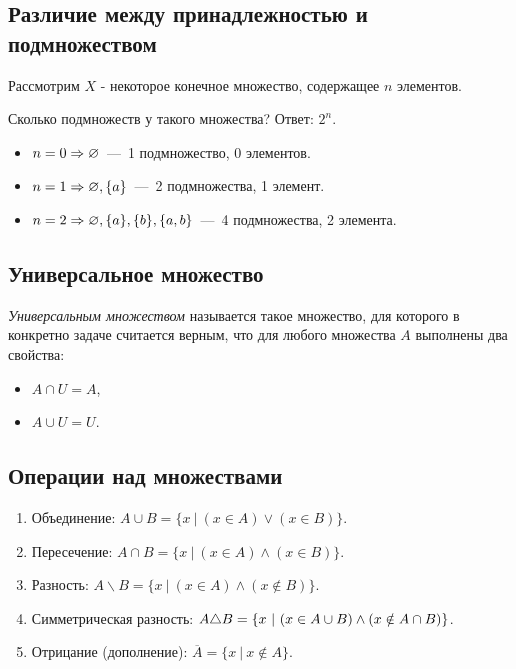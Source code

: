 \subsection{Различие между принадлежностью и подмножеством}
 
Рассмотрим $X$ - некоторое конечное множество, содержащее $n$ элементов.
 
Сколько подмножеств у такого множества? Ответ: $2^n$.
 
\begin{itemize}
     \item $n = 0 \Rightarrow \varnothing$~---~1 подмножество, 0 элементов.
     \item $n = 1 \Rightarrow \varnothing, \{a\}$~---~2 подмножества, 1 элемент.
     \item $n = 2 \Rightarrow \varnothing, \{a\}, \{b\}, \{a, b\}$~---~4 подмножества, 2 элемента.
\end{itemize}
 
\subsection{Универсальное множество}
 
\begin{definition}
    \textit{Универсальным множеством} называется такое множество, для которого в конкретно задаче считается верным, что для любого множества $A$ выполнены два свойства:
    \begin{itemize}
        \item $A \cap U = A$,
        \item $A \cup U = U$.
    \end{itemize}
\end{definition}
 
\subsection{Операции над множествами}
 
%
%
%
%
%
%
\begin{enumerate}
     \item Объединение: $A \cup B = \{x\ |\ (x \in A) \vee (x \in B)\}$.
     \item Пересечение: $A \cap B = \{x\ |\ (x \in A) \wedge (x \in B)\}$.
     \item Разность: $A \backslash B = \{x\ |\ (x \in A) \wedge (x \notin B)\}$.
     \item Симметрическая разность: $A \triangle B = \{x\ |\ (x \in A \cup B) \wedge (x \notin A \cap B)\}$.
     \item Отрицание (дополнение): $\overline{A} = \{x\ |\ x \notin A\}$.
\end{enumerate}

